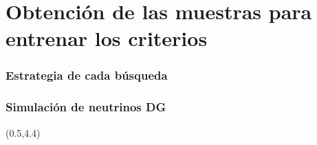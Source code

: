 \section[Muestras]{Obtenci\'on de las muestras para entrenar los criterios}


\begin{frame}
 \frametitle{Estrategia de cada b\'usqueda}
 \begin{center}
 \end{center}
\end{frame}

\begin{frame}
 \frametitle{Simulaci\'on de neutrinos DG}
 \begin{textblock}{14.5}(0.5,4.4)
 \end{textblock}
 
\end{frame}

